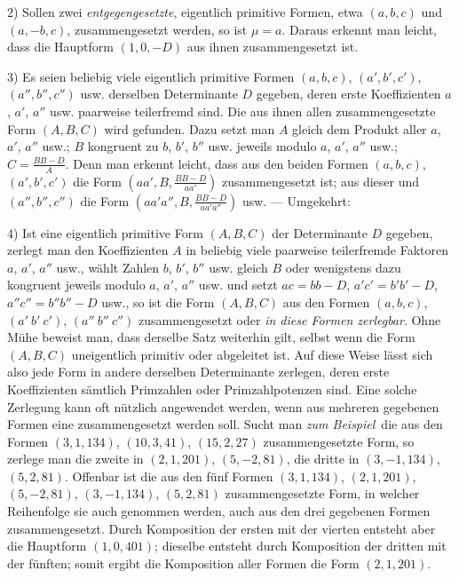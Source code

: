 2) Sollen zwei \textit{entgegengesetzte}, eigentlich primitive Formen, etwa $(a,b,c)$ und $(a,-b,c)$, zusammengesetzt werden, so ist $\mu=a$. Daraus erkennt man leicht, dass die Hauptform $(1,0,-D)$ aus ihnen zusammengesetzt ist.

3) Es seien beliebig viele eigentlich primitive Formen $(a,b,c)$, $(a',b',c')$, $(a'',b'',c'')$ usw. derselben Determinante $D$ gegeben, deren erste Koeffizienten $a$, $a'$, $a''$ usw. paarweise teilerfremd sind. Die aus ihnen allen zusammengesetzte Form $(A,B,C)$ wird gefunden. Dazu setzt man $A$ gleich dem Produkt aller $a$, $a'$, $a''$ usw.; $B$ kongruent zu $b$, $b'$, $b''$ usw. jeweils modulo $a$, $a'$, $a''$ usw.; $C=\frac{BB-D}{A}$. Denn man erkennt leicht, dass aus den beiden Formen $(a,b,c)$, $(a',b',c')$ die Form $(aa',B,\frac{BB-D}{aa'})$ zusammengesetzt ist; aus dieser und $(a'',b'',c'')$ die Form $(aa'a'',B,\frac{BB-D}{aa'a''})$ usw. --- Umgekehrt:

4) Ist eine eigentlich primitive Form $(A,B,C)$ der Determinante $D$ gegeben, zerlegt man den Koeffizienten $A$ in beliebig viele paarweise teilerfremde Faktoren $a$, $a'$, $a''$ usw., wählt Zahlen $b$, $b'$, $b''$ usw. gleich $B$ oder wenigstens dazu kongruent jeweils modulo $a$, $a'$, $a''$ usw. und setzt $ac=bb-D$, $a'c'=b'b'-D$, $a''c''=b''b''-D$ usw., so ist die Form $(A,B,C)$ aus den Formen $(a,b,c)$, $(a'\ b'\ c')$, $(a''\ b''\ c'')$ zusammengesetzt oder \textit{in diese Formen zerlegbar}. Ohne Mühe beweist man, dass derselbe Satz weiterhin gilt, selbst wenn die Form $(A,B,C)$ uneigentlich primitiv oder abgeleitet ist. Auf diese Weise lässt sich also jede Form in andere derselben Determinante zerlegen, deren erste Koeffizienten sämtlich Primzahlen oder Primzahlpotenzen sind. Eine solche Zerlegung kann oft nützlich angewendet werden, wenn aus mehreren gegebenen Formen eine zusammengesetzt werden soll. Sucht man \textit{zum Beispiel}\ die aus den Formen $(3,1,134)$, $(10,3,41)$, $(15,2,27)$ zusammengesetzte Form, so zerlege man die zweite in $(2,1,201)$, $(5,-2,81)$, die dritte in $(3,-1,134)$, $(5,2,81)$. Offenbar ist die aus den fünf Formen $(3,1,134)$, $(2,1,201)$, $(5,-2,81)$, $(3,-1,134)$, $(5,2,81)$ zusammengesetzte Form, in welcher Reihenfolge sie auch genommen werden, auch aus den drei gegebenen Formen zusammengesetzt. Durch Komposition der ersten mit der vierten entsteht aber die Hauptform $(1,0,401)$; dieselbe entsteht durch Komposition der dritten mit der fünften; somit ergibt die Komposition aller Formen die Form $(2,1,201)$.

